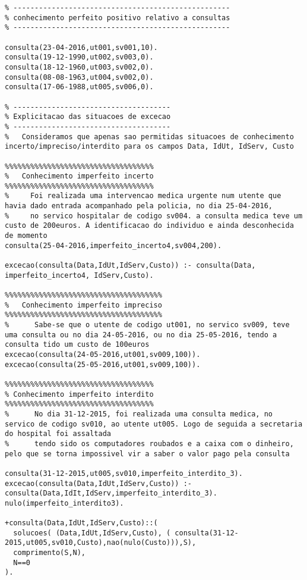 \documentclass[
  oneside,
  10pt, a4paper,
  footinclude=true,
  headinclude=true,
  cleardoublepage=empty
]{scrbook}
\begin{document}
\begin{lstlisting}
% ---------------------------------------------------
% conhecimento perfeito positivo relativo a consultas
% ---------------------------------------------------

consulta(23-04-2016,ut001,sv001,10).
consulta(19-12-1990,ut002,sv003,0).
consulta(18-12-1960,ut003,sv002,0).
consulta(08-08-1963,ut004,sv002,0).
consulta(17-06-1988,ut005,sv006,0).

% -------------------------------------
% Explicitacao das situacoes de excecao
% -------------------------------------
%   Consideramos que apenas sao permitidas situacoes de conhecimento incerto/impreciso/interdito para os campos Data, IdUt, IdServ, Custo 

%%%%%%%%%%%%%%%%%%%%%%%%%%%%%%%%%%%
%   Conhecimento imperfeito incerto
%%%%%%%%%%%%%%%%%%%%%%%%%%%%%%%%%%%
%     Foi realizada uma intervencao medica urgente num utente que havia dado entrada acompanhado pela policia, no dia 25-04-2016,
%     no servico hospitalar de codigo sv004. a consulta medica teve um custo de 200euros. A identificacao do individuo e ainda desconhecida de momento
consulta(25-04-2016,imperfeito_incerto4,sv004,200).

excecao(consulta(Data,IdUt,IdServ,Custo)) :- consulta(Data, imperfeito_incerto4, IdServ,Custo).

%%%%%%%%%%%%%%%%%%%%%%%%%%%%%%%%%%%%%
%   Conhecimento imperfeito impreciso
%%%%%%%%%%%%%%%%%%%%%%%%%%%%%%%%%%%%%
%      Sabe-se que o utente de codigo ut001, no servico sv009, teve uma consulta ou no dia 24-05-2016, ou no dia 25-05-2016, tendo a consulta tido um custo de 100euros
excecao(consulta(24-05-2016,ut001,sv009,100)).
excecao(consulta(25-05-2016,ut001,sv009,100)).

%%%%%%%%%%%%%%%%%%%%%%%%%%%%%%%%%%%
% Conhecimento imperfeito interdito
%%%%%%%%%%%%%%%%%%%%%%%%%%%%%%%%%%%
%      No dia 31-12-2015, foi realizada uma consulta medica, no servico de codigo sv010, ao utente ut005. Logo de seguida a secretaria do hospital foi assaltada
%      tendo sido os computadores roubados e a caixa com o dinheiro, pelo que se torna impossivel vir a saber o valor pago pela consulta 

consulta(31-12-2015,ut005,sv010,imperfeito_interdito_3).
excecao(consulta(Data,IdUt,IdServ,Custo)) :- consulta(Data,IdIt,IdServ,imperfeito_interdito_3).
nulo(imperfeito_interdito3).

+consulta(Data,IdUt,IdServ,Custo)::(
  solucoes( (Data,IdUt,IdServ,Custo), ( consulta(31-12-2015,ut005,sv010,Custo),nao(nulo(Custo))),S),
  comprimento(S,N),
  N==0
).
	\end{lstlisting}	
\end{document}
